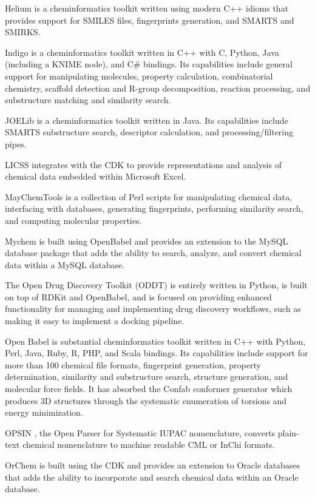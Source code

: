 Helium is a cheminformatics toolkit written using modern C++ idioms that provides support for SMILES files, fingerprints generation, and SMARTS and SMIRKS.

Indigo \cite{Pavlov_2011} is a cheminformatics toolkit written in C++ with C, Python, Java (including a KNIME node), and C\# bindings.  Its capabilities include general support for manipulating molecules, property calculation, combinatorial chemistry, scaffold detection and R-group decomposition, reaction processing, and substructure matching and similarity search.

JOELib is a cheminformatics toolkit written in Java. Its capabilities include SMARTS substructure search, descriptor calculation, and processing/filtering pipes.

LICSS \cite{Lawson_2012} integrates with the CDK to provide representations and analysis of chemical data embedded within Microsoft Excel.

MayChemTools is a collection of Perl scripts for manipulating chemical data, interfacing with databases, generating fingerprints, performing similarity search, and computing molecular properties.

Mychem is built using OpenBabel and provides an extension to the MySQL database package that adds the ability to search, analyze, and convert chemical data within a MySQL database.

The Open Drug Discovery Toolkit (ODDT) \cite{W_jcikowski_2015} is entirely written in Python, is built on top of RDKit and OpenBabel, and is focused on providing enhanced functionality for managing and implementing drug discovery workflows, such as making it easy to implement a docking pipeline. 

Open Babel \cite{O_Boyle_2011} is substantial cheminformatics toolkit written in C++ with Python, Perl, Java, Ruby, R, PHP, and Scala bindings.  Its capabilities include support for more than 100 chemical file formats, fingerprint generation, property determination, similarity and substructure search, structure generation, and molecular force fields.  It has absorbed the Confab \cite{confab} conformer generator which produces 3D structures through the systematic enumeration of torsions and energy minimization.

OPSIN \cite{Lowe_2011}, the Open Parser for Systematic IUPAC nomenclature, converts plain-text chemical nomenclature to machine readable CML or InChi formats.

OrChem is built using the CDK and provides an extension to Oracle databases that adds the ability to incorporate and search chemical data within an Oracle database.

